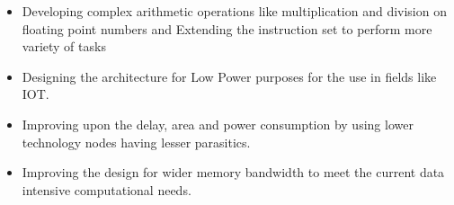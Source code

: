 \begin{itemize}

\item Developing complex arithmetic operations like multiplication and division on floating point numbers and Extending the instruction set to perform more variety of tasks

\item Designing the architecture for Low Power purposes for the use in fields like IOT.

\item Improving upon the delay, area and power consumption by using lower technology nodes having lesser parasitics.

\item Improving the design for wider memory bandwidth to meet the current data intensive computational needs.
\end{itemize}
 